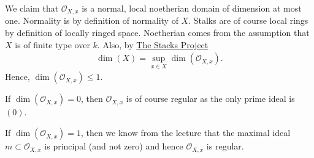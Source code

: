 \newcommand{\sheet}{11}




\maketitle{}

\begin{exercise}{1}
    We claim that $\mathcal{O}_{X,x}$ is a normal, local noetherian domain of
    dimension at most one. 
    Normality is by definition of normality of $X$. Stalks are of course local
    rings by definition of locally ringed space.
    Noetherian comes from the assumption that $X$ is of finite type over $k$.
    Also, by 
    \href{https://stacks.math.columbia.edu/tag/04MS}{The Stacks Project} 
    \begin{align*}
        \dim(X)=\sup_{x\in X}\dim(\mathcal{O}_{X,x}).
    \end{align*}
    Hence, $\dim(\mathcal{O}_{X,x})\le 1$.

    If $\dim(\mathcal{O}_{X,x})= 0$, then $\mathcal{O}_{X,x}$ is of course
    regular as the only prime ideal is $(0)$.

    If $\dim(\mathcal{O}_{X,x})= 1$, then we know from the lecture that the
    maximal ideal $m \subset \mathcal{O}_{X,x}$ is principal (and not zero) and
    hence $\mathcal{O}_{X,x}$ is regular.
\end{exercise}


